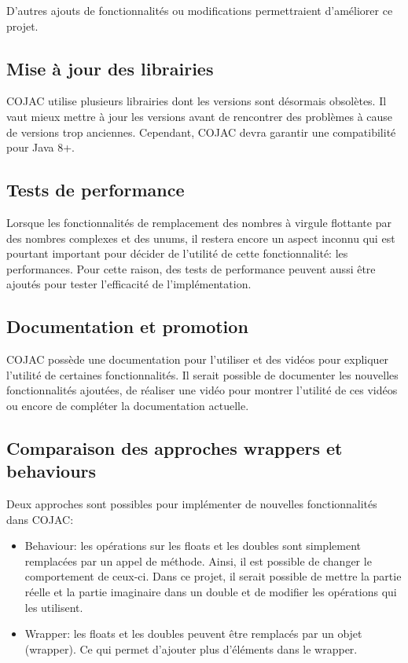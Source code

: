 D'autres ajouts de fonctionnalités ou modifications permettraient d'améliorer ce projet.

\subsection{Mise à jour des librairies}

COJAC \cite{COJAC} utilise plusieurs librairies dont les versions sont désormais obsolètes. Il vaut mieux mettre à jour les versions avant de rencontrer des problèmes à cause de versions trop anciennes. Cependant, COJAC \cite{COJAC} devra garantir une compatibilité pour Java 8+.

\subsection{Tests de performance}

Lorsque les fonctionnalités de remplacement des nombres à virgule flottante par des nombres complexes et des unums, il restera encore un aspect inconnu qui est pourtant important pour décider de l'utilité de cette fonctionnalité: les performances. Pour cette raison, des tests de performance peuvent aussi être ajoutés pour tester l'efficacité de l'implémentation.

\subsection{Documentation et promotion}

COJAC possède une documentation pour l'utiliser et des vidéos pour expliquer l'utilité de certaines fonctionnalités. Il serait possible de documenter les nouvelles fonctionnalités ajoutées, de réaliser une vidéo pour montrer l'utilité de ces vidéos ou encore de compléter la documentation actuelle.

\subsection{Comparaison des approches wrappers et behaviours}

Deux approches sont possibles pour implémenter de nouvelles fonctionnalités dans COJAC:
\begin{itemize}
    \item Behaviour: les opérations sur les floats et les doubles sont simplement remplacées par un appel de méthode. Ainsi, il est possible de changer le comportement de ceux-ci. Dans ce projet, il serait possible de mettre la partie réelle et la partie imaginaire dans un double et de modifier les opérations qui les utilisent.
    \item Wrapper: les floats et les doubles peuvent être remplacés par un objet (wrapper). Ce qui permet d'ajouter plus d'éléments dans le wrapper.
\end{itemize}

